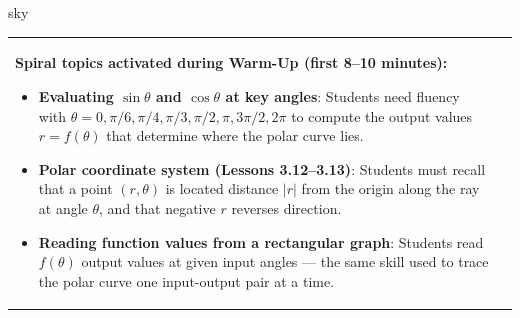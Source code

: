 \documentclass[10pt]{article}
\begin{document}
\begin{skillbox}{sky}
\begin{tabularx}{\linewidth}{@{}X c@{}}
\begin{minipage}[t]{0.96\linewidth}\vspace{0pt}
\textbf{Spiral topics activated during Warm-Up (first 8--10 minutes):}
\begin{itemize}[leftmargin=1.4em, itemsep=2pt]
  \item \textbf{Evaluating $\sin\theta$ and $\cos\theta$ at key angles}: Students need
    fluency with $\theta = 0, \pi/6, \pi/4, \pi/3, \pi/2, \pi, 3\pi/2, 2\pi$ to compute
    the output values $r = f(\theta)$ that determine where the polar curve lies.
  \item \textbf{Polar coordinate system (Lessons 3.12--3.13)}: Students must recall that
    a point $(r, \theta)$ is located distance $|r|$ from the origin along the ray at angle
    $\theta$, and that negative $r$ reverses direction.
  \item \textbf{Reading function values from a rectangular graph}: Students read $f(\theta)$
    output values at given input angles --- the same skill used to trace the polar curve
    one input-output pair at a time.
\end{itemize}
\end{minipage}
&
\end{tabularx}
\end{skillbox}

\vspace{0.08in}
\end{document}
